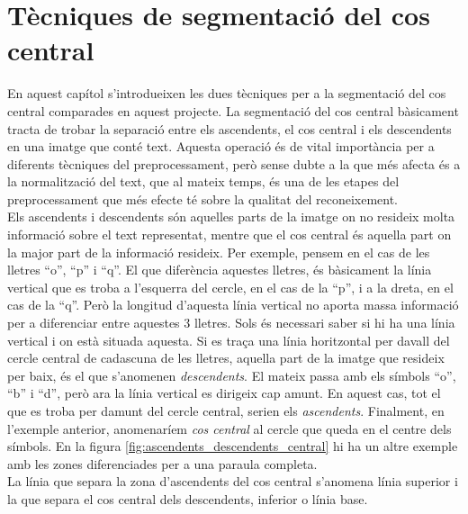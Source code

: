 \chapter{Tècniques de segmentació del cos central}
\label{cap:seg}
En aquest capítol s'introdueixen les dues tècniques per a la segmentació del cos central comparades en aquest projecte. La segmentació del cos central bàsicament tracta de trobar la separació entre els ascendents, el cos central i els descendents en una imatge que conté text. Aquesta operació és de vital importància per a diferents tècniques del preprocessament, però sense dubte a la que més afecta és a la normalització del text, que al mateix temps, és una de les etapes del preprocessament que més efecte té sobre la qualitat del reconeixement. \\

Els ascendents i descendents són aquelles parts de la imatge on no resideix molta informació sobre el text representat, mentre que el cos central és aquella part on la major part de la informació resideix. Per exemple, pensem en el cas de les lletres ``o'', ``p'' i ``q''. El que diferència aquestes lletres, és bàsicament la línia vertical que es troba a l'esquerra del cercle, en el cas de la ``p'', i a la dreta, en el cas de la ``q''. Però la longitud d'aquesta línia vertical no aporta massa informació per a diferenciar entre aquestes 3 lletres. Sols és necessari saber si hi ha una línia vertical i on està situada aquesta. Si es traça una línia horitzontal per davall del cercle central de cadascuna de les lletres, aquella part de la imatge que resideix per baix, és el que s'anomenen \emph{descendents}. El mateix passa amb els símbols ``o'', ``b'' i ``d'', però ara la línia vertical es dirigeix cap amunt. En aquest cas, tot el que es troba per damunt del cercle central, serien els \emph{ascendents}. Finalment, en l'exemple anterior, anomenaríem \emph{cos central} al cercle que queda en el centre dels símbols. En la figura \ref{fig:ascendents_descendents_central} hi ha un altre exemple amb les zones diferenciades per a una paraula completa. \\

La línia que separa la zona d'ascendents del cos central s'anomena línia superior i la que separa el cos central dels descendents, inferior o línia base. \\

